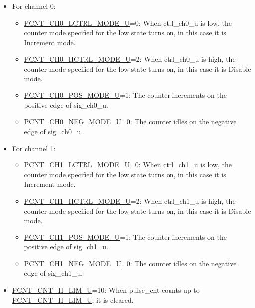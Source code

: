 \documentclass[main\_\_EN.tex]{subfiles}
\begin{document}
\begin{itemize}
    \item For channel 0:
    \begin{itemize}
        \item \hyperref[fielddesc:PCNTCH0LCTRLMODEUN]{PCNT\_CH0\_LCTRL\_MODE\_U}=0: When ctrl\_ch0\_u is low, the counter mode specified for the low state turns on, in this case it is Increment mode.

        \item \hyperref[fielddesc:PCNTCH0HCTRLMODEUN]{PCNT\_CH0\_HCTRL\_MODE\_U}=2: When ctrl\_ch0\_u is high, the counter mode specified for the low state turns on, in this case it is Disable mode.

        \item \hyperref[fielddesc:PCNTCH0POSMODEUN]{PCNT\_CH0\_POS\_MODE\_U}=1: The counter increments on the positive edge of sig\_ch0\_u.

        \item \hyperref[fielddesc:PCNTCH0NEGMODEUN]{PCNT\_CH0\_NEG\_MODE\_U}=0: The counter idles on the negative edge of sig\_ch0\_u.

    \end{itemize}

    \item For channel 1:
    \begin{itemize}
        \item \hyperref[fielddesc:PCNTCH1LCTRLMODEUN]{PCNT\_CH1\_LCTRL\_MODE\_U}=0: When ctrl\_ch1\_u is low, the counter mode specified for the low state turns on, in this case it is Increment mode.

        \item \hyperref[fielddesc:PCNTCH1HCTRLMODEUN]{PCNT\_CH1\_HCTRL\_MODE\_U}=2: When ctrl\_ch1\_u is high, the counter mode specified for the low state turns on, in this case it is Disable mode.

        \item \hyperref[fielddesc:PCNTCH1POSMODEUN]{PCNT\_CH1\_POS\_MODE\_U}=1: The counter increments on the positive edge of sig\_ch1\_u.

        \item \hyperref[fielddesc:PCNTCH1NEGMODEUN]{PCNT\_CH1\_NEG\_MODE\_U}=0: The counter idles on the negative edge of sig\_ch1\_u.

    \end{itemize}

    \item \hyperref[fielddesc:PCNTCNTHLIMUN]{PCNT\_CNT\_H\_LIM\_U}=10: When pulse\_cnt counts up to \hyperref[fielddesc:PCNTCNTHLIMUN]{PCNT\_CNT\_H\_LIM\_U}, it is cleared.

\end{itemize}
\end{document}
